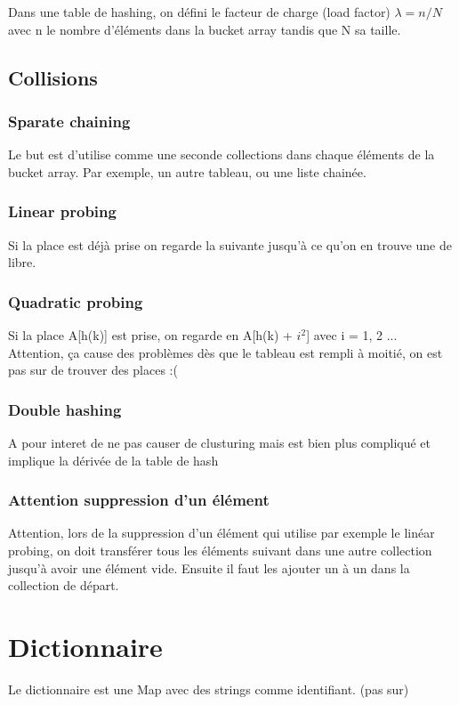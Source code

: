 \documentclass[a4paper]{article}
\begin{document}
Dans une table de hashing, on défini le facteur de charge (load factor) $\lambda = n/N$ avec n le nombre d'éléments dans la bucket array tandis que N sa taille.


\subsection{Collisions}
\subsubsection{Sparate chaining}
Le but est d'utilise comme une seconde collections dans chaque éléments de la bucket array. Par exemple, un autre tableau, ou une liste chainée.

\subsubsection{Linear probing}
Si la place est déjà prise on regarde la suivante jusqu'à ce qu'on en trouve une de libre.

\subsubsection{Quadratic probing}
Si la place A[h(k)] est prise, on regarde en A[h(k) + $i^2$] avec i = 1, 2 ...\\
Attention, ça cause des problèmes dès que le tableau est rempli à moitié, on est pas sur de trouver des places :(

\subsubsection{Double hashing}
A pour interet de ne pas causer de clusturing mais est bien plus compliqué et implique la dérivée de la table de hash


\subsubsection{Attention suppression d'un élément}
Attention, lors de la suppression d'un élément qui utilise par exemple le linéar probing, on doit transférer tous les éléments suivant dans une autre collection jusqu'à avoir une élément vide. Ensuite il faut les ajouter un à un dans la collection de départ.


\section{Dictionnaire}
Le dictionnaire est une Map avec des strings comme identifiant. (pas sur)
\end{document}
